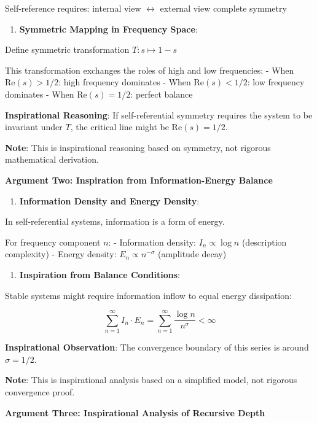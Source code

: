    Self-reference requires: internal view $\leftrightarrow$ external view complete symmetry

\begin{enumerate}
\item \textbf{Symmetric Mapping in Frequency Space}:
\end{enumerate}
   Define symmetric transformation $T: s \mapsto 1-s$
   
   This transformation exchanges the roles of high and low frequencies:
   - When $\text{Re}(s) > 1/2$: high frequency dominates
   - When $\text{Re}(s) < 1/2$: low frequency dominates
   - When $\text{Re}(s) = 1/2$: perfect balance
   
   \textbf{Inspirational Reasoning}: If self-referential symmetry requires the system to be invariant under $T$, the critical line might be $\text{Re}(s) = 1/2$.
   
   \textbf{Note}: This is inspirational reasoning based on symmetry, not rigorous mathematical derivation.

\textbf{Argument Two: Inspiration from Information-Energy Balance}

\begin{enumerate}
\item \textbf{Information Density and Energy Density}:
\end{enumerate}
   In self-referential systems, information is a form of energy.
   
   For frequency component $n$:
   - Information density: $I_n \propto \log n$ (description complexity)
   - Energy density: $E_n \propto n^{-\sigma}$ (amplitude decay)
   
\begin{enumerate}
\item \textbf{Inspiration from Balance Conditions}:
\end{enumerate}
   Stable systems might require information inflow to equal energy dissipation:
   
\begin{equation}
\sum_{n=1}^{\infty} I_n \cdot E_n = \sum_{n=1}^{\infty} \frac{\log n}{n^{\sigma}} < \infty
\end{equation}
   
   \textbf{Inspirational Observation}: The convergence boundary of this series is around $\sigma = 1/2$.
   
   \textbf{Note}: This is inspirational analysis based on a simplified model, not rigorous convergence proof.

\textbf{Argument Three: Inspirational Analysis of Recursive Depth}

